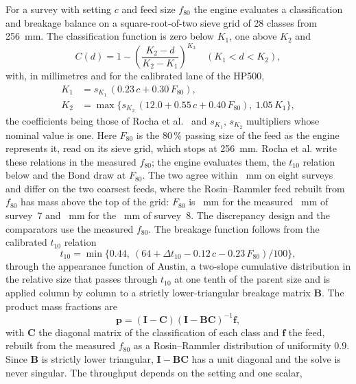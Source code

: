 \documentclass[journal]{IEEEtran}
\newcommand{\pct}{\,\%}
\begin{document}
For a survey with setting $c$ and feed size $f_{80}$ the engine evaluates a classification and breakage balance on a
square-root-of-two sieve grid of 28 classes from 256~mm. The classification function is zero below $K_1$, one above $K_2$ and
\begin{equation}
C(d)=1-\left(\frac{K_2-d}{K_2-K_1}\right)^{K_3}\quad (K_1<d<K_2),
\label{eq:class}
\end{equation}
with, in millimetres and for the calibrated lane of the HP500,
\begin{align}
K_1&=s_{K_1}\,(0.23\,c+0.30\,F_{80}),\nonumber\\
K_2&=\max\{s_{K_2}\,(12.0+0.55\,c+0.40\,F_{80}),\ 1.05\,K_1\},
\label{eq:k12}
\end{align}
the coefficients being those of Rocha et al.~\cite{rocha} and $s_{K_1}$, $s_{K_2}$ multipliers whose nominal value is one.
Here $F_{80}$ is the 80\pct{} passing size of the feed as the engine represents it, read on its sieve grid, which stops at
256~mm. Rocha et al. write these relations in the measured $f_{80}$; the engine evaluates them, the $t_{10}$ relation below
and the Bond draw at $F_{80}$. The two agree within \gridFeightyGapRest~mm on eight surveys and differ on the two coarsest
feeds, where the Rosin--Rammler feed rebuilt from $f_{80}$ has mass above the top of the grid: $F_{80}$ is \gridFeightySeven~mm
for the measured \measFeightySeven~mm of survey~7 and \gridFeightyEight~mm for the \measFeightyEight~mm of survey~8. The discrepancy
design and the comparators use the measured $f_{80}$. The breakage function follows from the calibrated $t_{10}$ relation
\begin{equation}
t_{10}=\min\{0.44,\ (64+\Delta t_{10}-0.12\,c-0.23\,F_{80})/100\},
\label{eq:t10}
\end{equation}
through the appearance function of Austin, a two-slope cumulative distribution in the relative size that passes through
$t_{10}$ at one tenth of the parent size and is applied column by column to a strictly lower-triangular breakage matrix
$\mathbf B$. The product mass fractions are
\begin{equation}
\mathbf p=(\mathbf I-\mathbf C)(\mathbf I-\mathbf B\mathbf C)^{-1}\mathbf f,
\label{eq:whiten}
\end{equation}
with $\mathbf C$ the diagonal matrix of the classification of each class and $\mathbf f$ the feed, rebuilt from the measured
$f_{80}$ as a Rosin--Rammler distribution of uniformity $0.9$. Since $\mathbf B$ is strictly lower triangular, $\mathbf I-\mathbf
B\mathbf C$ has a unit diagonal and the solve is never singular. The throughput depends on the setting and one scalar,
\end{document}
